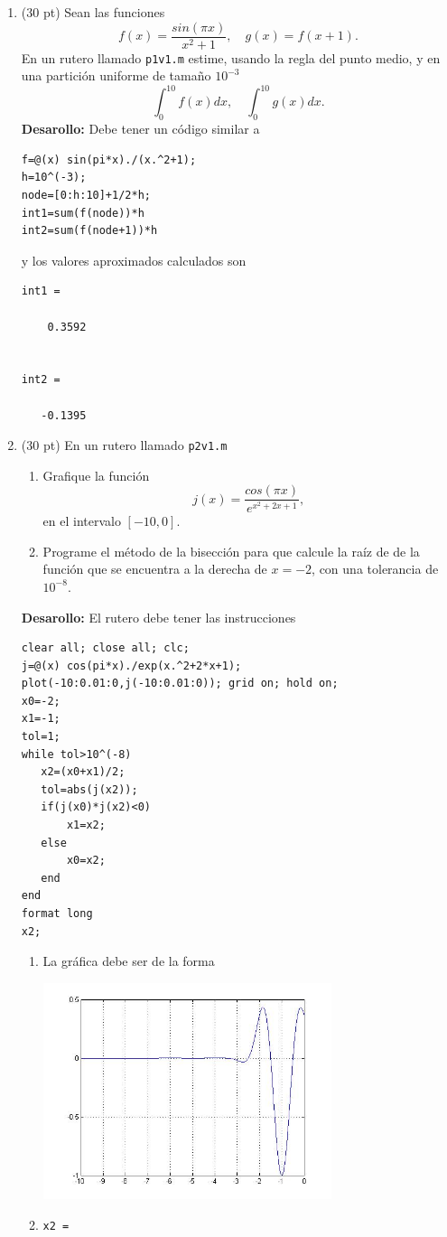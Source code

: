 \documentclass[11pt]{article}
\begin{document}
\begin{enumerate}
\item (30 pt) Sean las funciones
$$
f(x)=\frac{sin(\pi x)}{x^2+1},
\quad
g(x)=f(x+1).
$$
En un rutero llamado \texttt{p1v1.m} estime, usando la regla del punto medio, y en una partici\'on uniforme de tamaño $10^{-3}$ 
    $$
    \int_0^{10} f(x)dx, \quad 
        \int_0^{10} g(x)dx. 
    $$
\textbf{Desarollo:} Debe tener un c\'odigo similar a \fbox{30pt}
\begin{lstlisting}
f=@(x) sin(pi*x)./(x.^2+1);
h=10^(-3);
node=[0:h:10]+1/2*h;
int1=sum(f(node))*h
int2=sum(f(node+1))*h
\end{lstlisting}
y los valores aproximados calculados son 
\begin{lstlisting}
int1 =

    0.3592


int2 =

   -0.1395

\end{lstlisting}

\item (30 pt) En un rutero llamado \texttt{p2v1.m}
\begin{enumerate}
\item Grafique la funci\'on 
$$
j(x)=\frac{cos(\pi x)}{e^{x^2+2x+1}},
$$
en el intervalo $[-10,0]$.
\item Programe el m\'etodo de la bisecci\'on para que calcule la ra\'iz de de la funci\'on que se encuentra a la derecha de $x=-2$, con una tolerancia de $10^{-8}$.
\end{enumerate}
\textbf{Desarollo:}
El rutero debe tener las instrucciones
\begin{lstlisting}
clear all; close all; clc;
j=@(x) cos(pi*x)./exp(x.^2+2*x+1);
plot(-10:0.01:0,j(-10:0.01:0)); grid on; hold on;
x0=-2;
x1=-1;
tol=1;
while tol>10^(-8)
   x2=(x0+x1)/2;
   tol=abs(j(x2));
   if(j(x0)*j(x2)<0)
       x1=x2;
   else
       x0=x2;
   end
end
format long
x2;
\end{lstlisting}
\begin{enumerate}
\item La gr\'afica debe ser de la forma

\begin{centering}
\includegraphics[width=0.7\textwidth]{./p2v1.jpg}
\end{centering}
\item 
\begin{lstlisting}
x2 =


\end{lstlisting}
\end{enumerate}
\end{enumerate}
\end{document}
